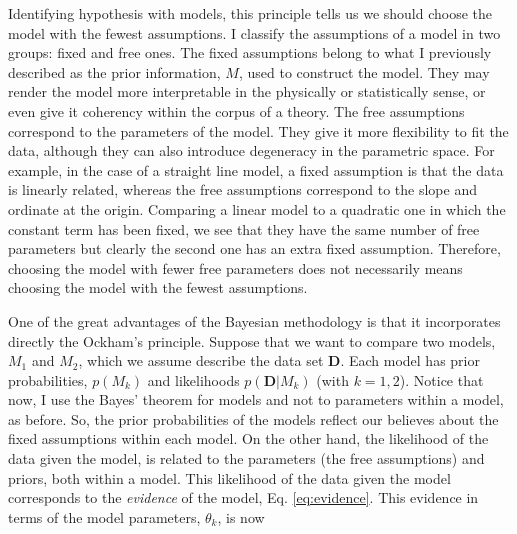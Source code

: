 Identifying hypothesis with models, this principle tells us we should choose the model with the fewest assumptions. I classify the assumptions of a model in two groups: fixed and free ones. The fixed assumptions belong to what I previously described as the prior information, $M$, used to construct the model. They may render the model more interpretable in the physically or statistically sense, or  even give it coherency within the corpus of a theory. The free assumptions correspond to the parameters of the model. They give it more flexibility to fit the data, although they can also introduce degeneracy in the parametric space. For example, in the case of a straight line model, a fixed assumption is that the data is linearly related, whereas the free assumptions correspond to the slope and ordinate at the origin. Comparing a linear model to a quadratic one in which the constant term has been fixed, we see that they have the same number of free parameters but clearly the second one has an extra fixed assumption. Therefore, choosing the model with fewer free parameters does not necessarily means choosing the model with the fewest assumptions.

One of the great advantages of the Bayesian methodology is that it incorporates directly the Ockham's principle. Suppose that we want to compare two models, $M_1$ and $M_2$, which we assume describe the data set $\mathbf{D}$. Each model has prior probabilities, $p(M_k)$ and likelihoods $p(\mathbf{D}|M_k)$ (with $k=1,2$). Notice that now, I use the Bayes' theorem for models and not to parameters within a model, as before. So, the prior probabilities of the models reflect our believes about the fixed assumptions within each model. On the other hand, the likelihood of the data given the model, is related to the parameters (the free assumptions) and priors, both within a model. This likelihood of the data given the model corresponds to the \emph{evidence} of the model, Eq. \ref{eq:evidence}. This evidence in terms of the model parameters, $\theta_k$, is now


